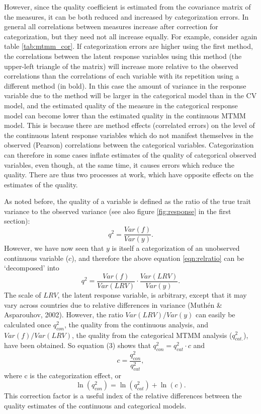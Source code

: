 \documentclass[a4paper,12pt]{article}
\begin{document}
However, since the quality coefficient is estimated from the covariance matrix of the measures, it can be both reduced and increased by categorization errors. In general all correlations between measures increase after correction for categorization, but they need not all increase equally. For example, consider again table \ref{tab:mtmm_cor}. If categorization errors are higher using the first method, the correlations between the latent response variables using this method (the upper-left triangle of the matrix) will increase more relative to the observed correlations than the correlations of each variable with its repetition using a different method (in bold). In this case the amount of variance in the response variable due to the method will be larger in the categorical model than in the CV model, and the estimated quality of the measure in the categorical response model can become lower than the estimated quality in the continuous MTMM model. This is because there are method effects (correlated errors) on the level of the continuous latent response variables which do not manifest themselves in the observed (Pearson) correlations between the categorical variables. Categorization can therefore in some cases inflate estimates of the quality of categorical observed variables, even though, at the same time, it causes errors which reduce the quality. There are thus two processes at work, which have opposite effects on the estimates of the quality.

As noted before, the quality of a variable is defined as the ratio of the true trait variance to the observed variance (see also figure \ref{fig:response} in the first section):
\begin{equation}
q^2 = \frac{Var(f)}{Var(y)}.\label{eqn:relratio}
\end{equation}
However, we have now seen that $y$ is itself a categorization of an unobserved continuous variable ($c$), and therefore the above equation \ref{eqn:relratio} can be `decomposed' into
\begin{equation}
q^2 =  \frac{ Var(f)}{Var(LRV)} \cdot \frac{Var(LRV)}{Var(y)}.		
\end{equation}
The scale of $LRV$, the latent response variable, is arbitrary, except that it may vary across countries due to relative differences in variance (Muth\'en \& Asparouhov, 2002). However, the ratio $Var(LRV)/Var(y)$ can easily be calculated once $q^2_{con}$, the quality from the continuous analysis, and $Var(f)/Var(LRV)$, the quality from the categorical MTMM analysis ($q^2_{cat.}$), have been obtained. So equation (3) shows that $q^2_{con} = q^2_{cat} \cdot c$  and 
$$
c = \frac{q^2_{con}} {q^2_{cat}},
$$ 
where c is the categorization effect, or
$$ 
\ln (q^2_{con}) = \ln (q^2_{cat})  + \ln(c).
$$
This correction factor is a useful index of the relative differences between the quality estimates of the continuous and categorical models. 
\end{document}
